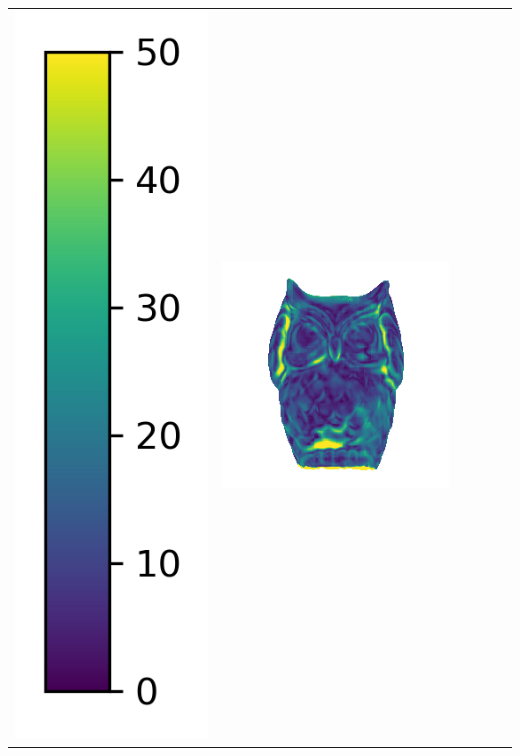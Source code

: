 \begin{tabularx}{\linewidth}{@{}Y@{}Y@{}Y@{}Y@{}Y@{}Y@{}}
\includegraphics[width=0.2\linewidth]{semisynthetic/colorbar_error_vertical.png} &
\includegraphics[width=\linewidth]{semisynthetic/20160617_15_ours_err.png} &

\end{tabularx}

